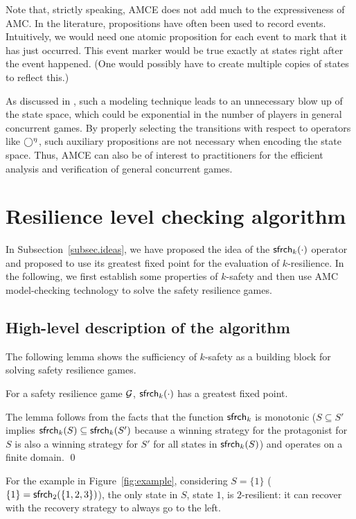 Note that, strictly speaking, AMCE does not add much to the 
expressiveness of AMC.  
In the literature, propositions have often been used to 
record events.  
Intuitively, we would need one atomic proposition for each event to mark that it has just occurred.
This event marker would be true exactly at states right after the event happened. 
(One would possibly have to create multiple copies of states to reflect this.)
 
As discussed in \cite{Wang04}, such a modeling technique leads to an unnecessary 
blow up of the state space, which could be exponential in the number 
of players in general concurrent games.  
\label{reply1.event.blowup} 
By properly selecting 
the transitions with respect to operators like $\bigcirc^\eta$, 
such auxiliary propositions are not necessary when encoding the state space.  
Thus, AMCE can also be of interest to practitioners for the
efficient analysis and verification of general concurrent games.


\section{Resilience level checking algorithm}
In Subsection~\ref{subsec.ideas}, we have proposed the 
idea of the $\mathsf{sfrch}_k(\cdot)$ operator and proposed 
to use its greatest\label{reply2.empty.fixed point} fixed point 
for the evaluation of $k$-resilience.
In the following, we first establish some properties of $k$-safety 
and then use AMC model-checking technology to solve the 
safety resilience games.  
\subsection{High-level description of the algorithm}
The following lemma shows the sufficiency of $k$-safety as a building block for 
solving safety resilience games.

\begin{lemma} 
\label{fixed point}
For a safety resilience game ${\cal G}$, 
$\mathsf{sfrch}_k(\cdot)$ has a greatest fixed point.
\end{lemma}
\pf 
The lemma follows from the facts that
the function $\mathsf{sfrch}_k$ is monotonic
($S \subseteq S'$ implies $\mathsf{sfrch}_k ( S ) \subseteq \mathsf{sfrch}_k ( S' )$ 
because a winning strategy for the protagonist 
for $S$ is also a winning strategy for $S'$ 
for all states in $\mathsf{sfrch}_k(S)$) and operates on a finite domain.
\qed


For the example in Figure~\ref{fig:example}, 
considering $S=\{1\}$ ($\{1\}=\mathsf{sfrch}_2(\{1,2,3\})$), 
the only state in $S$, state $1$, is $2$-resilient: 
it can recover with the recovery strategy to always go to the left.

